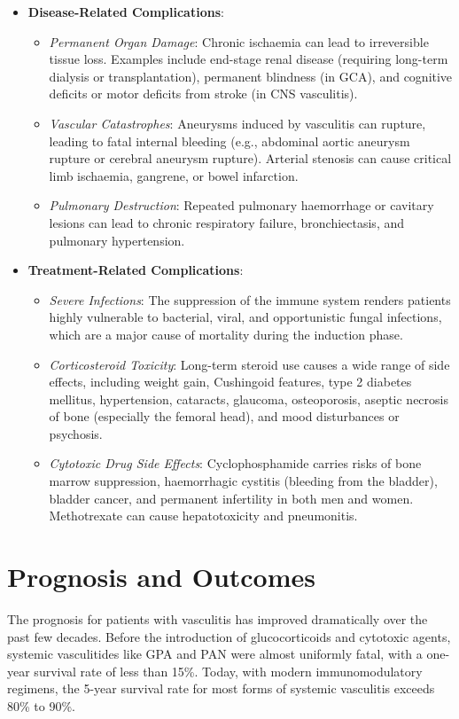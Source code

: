 \begin{itemize}
\item \textbf{Disease-Related Complications}:
  \begin{itemize}
  \item \textit{Permanent Organ Damage}: Chronic ischaemia can lead to irreversible tissue loss. Examples include end-stage renal disease (requiring long-term dialysis or transplantation), permanent blindness (in GCA), and cognitive deficits or motor deficits from stroke (in CNS vasculitis).
  \item \textit{Vascular Catastrophes}: Aneurysms induced by vasculitis can rupture, leading to fatal internal bleeding (e.g., abdominal aortic aneurysm rupture or cerebral aneurysm rupture). Arterial stenosis can cause critical limb ischaemia, gangrene, or bowel infarction.
  \item \textit{Pulmonary Destruction}: Repeated pulmonary haemorrhage or cavitary lesions can lead to chronic respiratory failure, bronchiectasis, and pulmonary hypertension.
  \end{itemize}
\item \textbf{Treatment-Related Complications}:
  \begin{itemize}
  \item \textit{Severe Infections}: The suppression of the immune system renders patients highly vulnerable to bacterial, viral, and opportunistic fungal infections, which are a major cause of mortality during the induction phase.
  \item \textit{Corticosteroid Toxicity}: Long-term steroid use causes a wide range of side effects, including weight gain, Cushingoid features, type 2 diabetes mellitus, hypertension, cataracts, glaucoma, osteoporosis, aseptic necrosis of bone (especially the femoral head), and mood disturbances or psychosis.
  \item \textit{Cytotoxic Drug Side Effects}: Cyclophosphamide carries risks of bone marrow suppression, haemorrhagic cystitis (bleeding from the bladder), bladder cancer, and permanent infertility in both men and women. Methotrexate can cause hepatotoxicity and pneumonitis.
  \end{itemize}
\end{itemize}

\section*{Prognosis and Outcomes}
The prognosis for patients with vasculitis has improved dramatically over the past few decades. Before the introduction of glucocorticoids and cytotoxic agents, systemic vasculitides like GPA and PAN were almost uniformly fatal, with a one-year survival rate of less than 15\%. Today, with modern immunomodulatory regimens, the 5-year survival rate for most forms of systemic vasculitis exceeds 80\% to 90\%.

